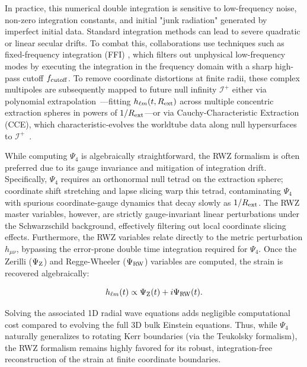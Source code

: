 \documentclass[%
 reprint,
superscriptaddress,
 amsmath,amssymb,
 aps,
]{revtex4-2}
\begin{document}
In practice, this numerical double integration is sensitive to low-frequency noise, non-zero integration constants, and initial "junk radiation" generated by imperfect initial data. Standard integration methods can lead to severe quadratic or linear secular drifts. To combat this, collaborations use techniques such as fixed-frequency integration (FFI) \cite{Reisswig:2010di}, which filters out unphysical low-frequency modes by executing the integration in the frequency domain with a sharp high-pass cutoff $f_{\rm cutoff}$. To remove coordinate distortions at finite radii, these complex multipoles are subsequently mapped to future null infinity $\mathcal{I}^+$ either via polynomial extrapolation~\cite{Boyle:2008zua}—fitting $h_{\ell m}(t, R_{\rm ext})$ across multiple concentric extraction spheres in powers of $1/R_{\rm ext}$—or via Cauchy-Characteristic Extraction (CCE), which characteristic-evolves the worldtube data along null hypersurfaces to $\mathcal{I}^+$~\cite{Babiuc:2006wk, Moxon:2021gbv, Bishop:1997ik}.

While computing $\Psi_4$ is algebraically straightforward, the RWZ formalism is often preferred due to its gauge invariance and mitigation of integration drift. Specifically, $\Psi_4$ requires an orthonormal null tetrad on the extraction sphere; coordinate shift stretching and lapse slicing warp this tetrad, contaminating $\Psi_4$ with spurious coordinate-gauge dynamics that decay slowly as $1/R_{\rm ext}$. The RWZ master variables, however, are strictly gauge-invariant linear perturbations under the Schwarzschild background, effectively filtering out local coordinate slicing effects. Furthermore, the RWZ variables relate directly to the metric perturbation $h_{\mu\nu}$, bypassing the error-prone double time integration required for $\Psi_4$. Once the Zerilli ($\Psi_{\rm Z}$) and Regge-Wheeler ($\Psi_{\rm RW}$) variables are computed, the strain is recovered algebraically:
    
\begin{equation}h_{\ell m}(t) \propto \Psi_{\rm Z}(t) + i \Psi_{\rm RW}(t).\end{equation}
    
Solving the associated 1D radial wave equations adds negligible computational cost compared to evolving the full 3D bulk Einstein equations. Thus, while $\Psi_4$ naturally generalizes to rotating Kerr boundaries (via the Teukolsky formalism), the RWZ formalism remains highly favored for its robust, integration-free reconstruction of the strain at finite coordinate boundaries.
\end{document}
